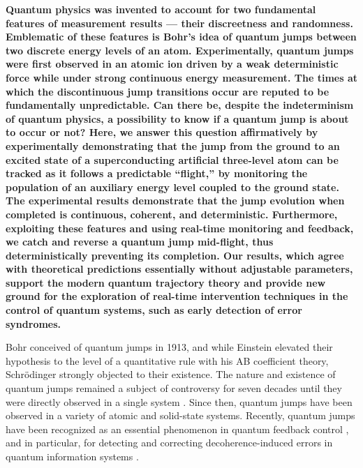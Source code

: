 \documentclass[
	 			preprint,     		superscriptaddress, 																longbibliography,
		amsmath, amssymb,
		aps,  prb,   		floatfix,
		linenumbers     
	]{revtex4-1}
\begin{document}
\textbf{ 
Quantum physics was invented to account for  
 two fundamental features of measurement results — their discreetness and  randomness. Emblematic of these features is Bohr’s idea of quantum jumps between two discrete energy levels of an atom\cite{Bohr1913}. Experimentally, quantum jumps were first observed in an  atomic ion driven by a weak deterministic force while under strong continuous energy measurement\cite{Nagourney1986, Sauter1986, Bergquist1986}. The times at which the discontinuous jump transitions occur are reputed to be fundamentally unpredictable. 
Can there be, despite the indeterminism of quantum physics, a possibility to know if a quantum jump is about to occur or not?
Here, we answer this question affirmatively by experimentally demonstrating that the  jump from the ground to an excited state of a superconducting artificial three-level atom can be tracked as it follows a predictable ``flight,'' 
by monitoring the population of an auxiliary energy level coupled to the ground state.  The experimental results demonstrate that the jump evolution when completed is continuous, coherent, and deterministic. Furthermore, exploiting these features and using real-time monitoring and feedback, we catch and reverse a quantum jump mid-flight, thus deterministically preventing its completion. 
Our results, which agree with theoretical predictions essentially without adjustable parameters,  support the modern quantum trajectory theory\cite{Carmichael1993, Gardiner1992-original-traj, Dalibard1992-original-traj, Plenio1998, Korotkov1999-original-traj} and  provide new ground for the exploration of real-time intervention techniques in the control of quantum systems, such as early detection of error syndromes.
}
\vspace{1em}


Bohr conceived of quantum jumps \cite{Bohr1913} in 1913, and while Einstein elevated their hypothesis to the level of a quantitative rule with his AB coefficient theory\cite{Einstein1916, Einstein1917}, Schr\"{o}dinger strongly objected to their existence\cite{Schrodinger1952}. The nature and existence of quantum jumps remained a subject of controversy for seven decades until they were directly observed in a single system \cite{Nagourney1986, Sauter1986, Bergquist1986}. 
Since then, quantum jumps have been observed in a variety of  atomic\cite{Basche1995, Peil1999, Gleyzes2007, Guerlin2007} and solid-state \cite{Jelezko2002, Neumann2010, Robledo2011, Vijay2011, Hatridge2013} systems.  
Recently,  quantum jumps have been recognized as an essential phenomenon in quantum feedback  control \cite{Deleglise2008, Sayrin2001}, and in particular, for detecting and correcting decoherence-induced errors in quantum information systems \cite{Sun2013, Ofek2016}. 
\end{document}
